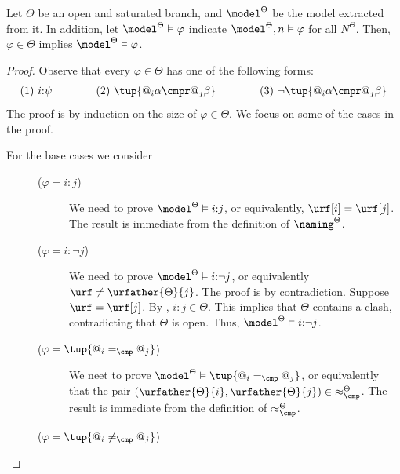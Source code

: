 \begin{lem}\label{prop:truthlemma}
    Let $\Theta$ be an open and saturated branch, and $\model^{\Theta}$ be the model extracted from it. 
    In addition, let $\model^{\Theta} \vDash \varphi$ indicate $\model^{\Theta}, n \vDash \varphi$ for all $N^{\Theta}$.
    Then, $\varphi \in \Theta$ implies $\model^{\Theta} \vDash \varphi$.
\end{lem}
\begin{proof}
    Observe that every $\varphi \in \Theta$ has one of the following forms: 
    \[
        (1)~i{:}\psi \qquad\qquad
        (2)~\tup{@_i \alpha \cmpr @_j\beta } \qquad\qquad
        (3)~\lnot\tup{@_i \alpha \cmpr @_j\beta }
    \]
    The proof is by induction on the size of $\varphi \in \Theta$.
    We focus on some of the cases in the proof.
    \begin{description}
        \item[\textnormal{For the base cases we consider}] \hfill
            \begin{description}
                \item[($\varphi = i{:}j$)] 
                    We need to prove $\model^\Theta \vDash i{:}j$, or equivalently, $\urf[i] = \urf[j]$.
                    The result is immediate from the definition of $\naming^{\Theta}$.
                \item[($\varphi = i{:}\lnot j$)]
                    We need to prove $\model^\Theta \vDash i{:}\lnot j$, or equivalently $\urf \neq \urfather{\Theta}{j}$.
                    The proof is by contradiction.
                    Suppose $\urf = \urf[j]$.
                    By , $i{:}j \in \Theta$.
                    This implies that $\Theta$ contains a clash, contradicting that $\Theta$ is open. Thus, $\model^\Theta \vDash i{:}\lnot j$. 
                \item[($\varphi = \tup{@_i =_{\cmp} @_j}$)] 
                    We neet to prove $\model^\Theta \vDash \tup{@_i =_{\cmp} @_j}$, or equivalently that the pair ${(\urfather{\Theta}{i}, \urfather{\Theta}{j})} \in {\approx^{\Theta}_{\cmp}}$.
                    The result is immediate from the definition of ${\approx^{\Theta}_{\cmp}}$.
                \item[($\varphi = \tup{ @_i \neq_{\cmp} @_j}$)] 

\end{description}
\end{description}
\end{proof}
